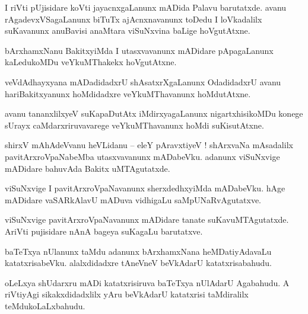 \documentclass{article}
\begin{document}
\begin{mn}%
I riVti pUjisidare koVti jayacnxgaLanunx mADida Palavu barutatxde. avanu rAgadevxVSagaLanunx biTuTx 
ajAcnxnavanunx toDedu I loVkadalilx suKavanunx anuBavisi anaMtara viSuNxvina baLige hoVgutAtxne.
\end{mn}

\begin{mn}%
bArxhamxNanu BakitxyiMda I utasxvavanunx mADidare pApagaLanunx kaLedukoMDu veYkuMThakekx hoVgutAtxne.
\end{mn}

\begin{mn}%
veVdAdhayxyana mADadidadxrU shAsatxrXgaLanunx OdadidadxrU avanu hariBakitxyanunx hoMdidadxre 
veYkuMThavanunx hoMdutAtxne.
\end{mn}

\begin{mn}%
avanu tananxlilxyeV suKapaDutAtx iMdirxyagaLanunx nigartxhisikoMDu konege sUrayx 
caMdarxriruvavarege veYkuMThavanunx hoMdi suKisutAtxne.
\end{mn}


\begin{mn}%
shirxV mAhAdeVvanu heVLidanu -- eleY pAravxtiyeV ! shArxvaNa mAsadalilx pavitArxroVpaNabeMba 
utasxvavanunx mADabeVku. adanunx viSuNxvige mADidare bahuvAda Bakitx uMTAgutatxde.
\end{mn}

\begin{mn}%
viSuNxvige I pavitArxroVpaNavanunx sherxdedhxyiMda mADabeVku. hAge mADidare vaSARkAlavU mADuva 
vidhigaLu saMpUNaRvAgutatxve.
\end{mn}

\begin{mn}%
viSuNxvige pavitArxroVpaNavanunx mADidare tanate suKavuMTAgutatxde. AriVti pujisidare nAnA bageya 
suKagaLu barutatxve.
\end{mn}

\begin{mn}%
baTeTxya nUlanunx taMdu adanunx bArxhamxNana heMDatiyAdavaLu katatxrisabeVku. alalxdidadxre 
tAneVneV beVkAdarU katatxrisabahudu.
\end{mn}

\begin{mn}%
oLeLxya shUdarxru mADi katatxrisiruva baTeTxya nUlAdarU Agabahudu. A riVtiyAgi sikakxdidadxlilx 
yAru beVkAdarU katatxrisi taMdiralilx teMdukoLaLxbahudu.
\end{mn}
\end{document}
